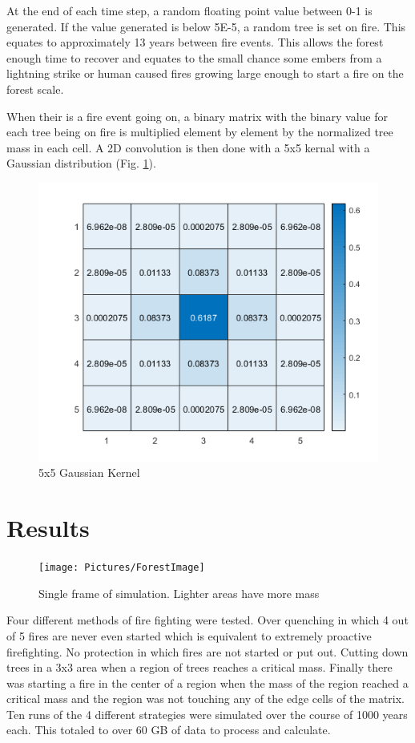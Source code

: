 \documentclass[ aps, pra, reprint, notitlepage ]{revtex4-1}
\begin{document}
At the end of each time step, a random floating point value between 0-1 is generated. If the value generated is below 5E-5, a random tree is set on fire. This equates to approximately 13 years between fire events. This allows the forest enough time to recover and equates to the small chance some embers from a lightning strike or human caused fires growing large enough to start a fire on the forest scale.

When their is a fire event going on, a binary matrix with the binary value for each tree being on fire is multiplied element by element by the normalized tree mass in each cell. A 2D convolution is then done with a 5x5 kernal with a Gaussian distribution (Fig. \ref{GuassDist}).
	
\begin{figure}[ht]
	\includegraphics[scale=0.7]{Pictures/Guassian}
	\caption{\label{GuassDist} 5x5 Gaussian Kernel}
\end{figure}	

\section{\label{Results}Results}

\begin{figure}[ht]
	\texttt{[image: Pictures/ForestImage]}
	\caption{\label{SimulationSlice} Single frame of simulation. Lighter areas have more mass}
\end{figure}

Four different methods of fire fighting were tested. Over quenching in which 4 out of 5 fires are never even started which is equivalent to extremely proactive firefighting. No protection in which fires are not started or put out. Cutting down trees in a 3x3 area when a region of trees reaches a critical mass. Finally there was starting a fire in the center of a region when the mass of the region reached a critical mass and the region was not touching any of the edge cells of the matrix. Ten runs of the 4 different strategies were simulated over the course of 1000 years each. This totaled to over 60 GB of data to process and calculate.
\end{document}

